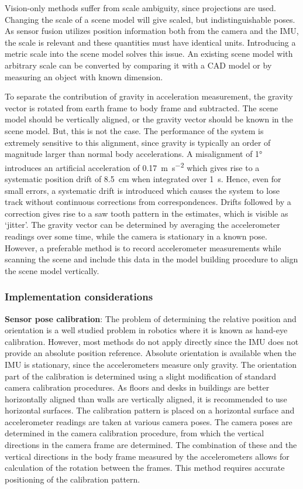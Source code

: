 Vision-only methods suffer from scale ambiguity, since projections are used. Changing the scale of a scene model will give scaled, but indistinguishable poses. As sensor fusion utilizes position information both from the camera and the IMU, the scale is relevant and these quantities must have identical units. Introducing a metric scale into the scene model solves this issue. An existing scene model with arbitrary scale can be converted by comparing it with a CAD model or by measuring an object with known dimension.

To separate the contribution of gravity in acceleration measurement, the gravity vector is rotated from earth frame to body frame and subtracted. The scene model should be vertically aligned, or the gravity vector should be known in the scene model. But, this is not the case. The performance of the system is extremely sensitive to this alignment, since gravity is typically an order of magnitude larger than normal body accelerations. A misalignment of \ang{1} introduces an artificial acceleration of \SI{0.17}{\m\per\s\squared} which gives rise to a systematic position drift of \SI{8.5}{\cm} when integrated over \SI{1}{\s}. Hence, even for small errors, a systematic drift is introduced which causes the system to lose track without continuous corrections from correspondences. Drifts followed by a correction gives rise to a saw tooth pattern in the estimates, which is visible as `jitter'. The gravity vector can be determined by averaging the accelerometer readings over some time, while the camera is stationary in a known pose. However, a preferable method is to record accelerometer measurements while scanning the scene and include this data in the model building procedure to align the scene model vertically.


\subsubsection{Implementation considerations}  

\textbf{Sensor pose calibration}: The problem of determining the relative position and orientation is a well studied problem in robotics where it is known as hand-eye calibration. However, most methods do not apply directly since the IMU does not provide an absolute position reference. Absolute orientation is available when the IMU is stationary, since the accelerometers measure only gravity. The orientation part of the calibration is determined using a slight modification of standard camera calibration procedures. As floors and desks in buildings are better horizontally aligned than walls are vertically aligned, it is recommended to use horizontal surfaces. The calibration pattern is placed on a horizontal surface and accelerometer readings are taken at various camera poses. The camera poses are determined in the camera calibration procedure, from which the vertical directions in the camera frame are determined. The combination of these and the vertical directions in the body frame measured by the accelerometers allows for calculation of the rotation between the frames. This method requires accurate positioning of the calibration pattern. 

